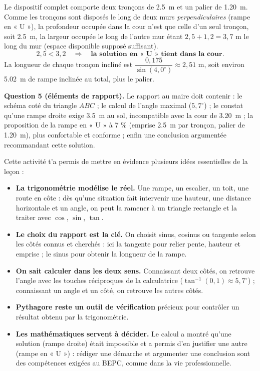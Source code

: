 \documentclass[11pt]{article}
\newcounter{popsec}
\newcounter{popsub}
\newcommand{\courssub}[1]{%
  \stepcounter{popsub}%
  \par\vspace{9pt}\noindent{\popxbold\fontsize{11.5}{13}\selectfont\color{popink}{\color{poporange}\thepopsec.\thepopsub}\hspace{6pt}#1}\par\nopagebreak\vspace{4pt}
}
\begin{document}
\begin{exoresolu}
Le dispositif complet comporte deux tronçons de \SI{2,5}{m} et un palier de \SI{1,20}{m}. Comme les tronçons sont disposés le long de deux murs \emph{perpendiculaires} (rampe en « U »), la profondeur occupée dans la cour n'est que celle d'un seul tronçon, soit \SI{2,5}{m}, la largeur occupée le long de l'autre mur étant $2{,}5 + 1{,}2 = 3{,}7$ m le long du mur (espace disponible supposé suffisant).
\[ 2{,}5 < 3{,}2 \quad \Rightarrow \quad \textbf{la solution en « U » tient dans la cour.} \]
La longueur de chaque tronçon incliné est $\dfrac{0{,}175}{\sin(4{,}0^{\circ})} \approx 2{,}51$ m, soit environ \SI{5,02}{m} de rampe inclinée au total, plus le palier.

\medskip
\textbf{Question 5 (éléments de rapport).} Le rapport au maire doit contenir : le schéma coté du triangle $ABC$ ; le calcul de l'angle maximal ($5{,}7^{\circ}$) ; le constat qu'une rampe droite exige \SI{3,5}{m} au sol, incompatible avec la cour de \SI{3,20}{m} ; la proposition de la rampe en « U » à 7 \% (emprise \SI{2,5}{m} par tronçon, palier de \SI{1,20}{m}), plus confortable et conforme ; enfin une conclusion argumentée recommandant cette solution.
\end{exoresolu}

\courssub{Bilan de l'activité}

Cette activité t'a permis de mettre en évidence plusieurs idées essentielles de la leçon :

\begin{itemize}
\item \textbf{La trigonométrie modélise le réel.} Une rampe, un escalier, un toit, une route en côte : dès qu'une situation fait intervenir une hauteur, une distance horizontale et un angle, on peut la ramener à un triangle rectangle et la traiter avec $\cos$, $\sin$, $\tan$.
\item \textbf{Le choix du rapport est la clé.} On choisit sinus, cosinus ou tangente selon les côtés connus et cherchés : ici la tangente pour relier pente, hauteur et emprise ; le sinus pour obtenir la longueur de la rampe.
\item \textbf{On sait calculer dans les deux sens.} Connaissant deux côtés, on retrouve l'angle avec les touches réciproques de la calculatrice ($\tan^{-1}(0{,}1) \approx 5{,}7^{\circ}$) ; connaissant un angle et un côté, on retrouve les autres côtés.
\item \textbf{Pythagore reste un outil de vérification} précieux pour contrôler un résultat obtenu par la trigonométrie.
\item \textbf{Les mathématiques servent à décider.} Le calcul a montré qu'une solution (rampe droite) était impossible et a permis d'en justifier une autre (rampe en « U ») : rédiger une démarche et argumenter une conclusion sont des compétences exigées au BEPC, comme dans la vie professionnelle.
\end{itemize}
\end{document}
